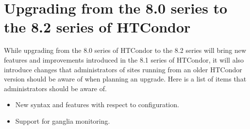 \section{\label{sec:to-8.2}Upgrading from the 8.0 series to the 8.2 series of HTCondor}

While upgrading from the 8.0 series of HTCondor to the 8.2 series 
will bring 
new features and improvements introduced in the 8.1 series of HTCondor,
it will
also introduce changes that administrators of sites running from an older
HTCondor version should be aware of when planning an upgrade.  
Here is a list of items that administrators should be aware of.

\begin{itemize}

\item New syntax and features with respect to configuration.

\item Support for ganglia monitoring.

\end{itemize}

